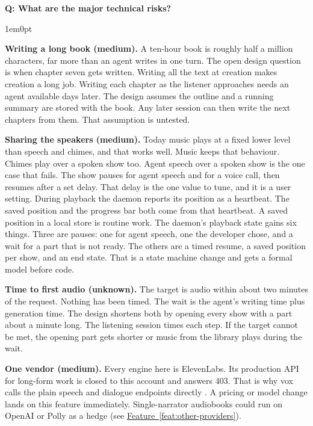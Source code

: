 \documentclass[11pt,letterpaper]{article} %
\newcounter{faqnum} %
\newenvironment{faqpair}[1]{%
  \needspace{4\baselineskip}%
  \vspace{0.5em}%
  \refstepcounter{faqnum}%
  \noindent\textbf{\color{SectionBlue}Q\thefaqnum: #1}\par\nopagebreak[4]%
  \vspace{0.2em}%
  \begin{adjustwidth}{1em}{0pt}%
  \setlength{\parindent}{0pt}%
  \setlength{\parskip}{0.5em}%
}{%
  \end{adjustwidth}%
  \vspace{0.5em}%
}
\newcommand{\featureref}[1]{\hyperref[#1]{Feature~\ref*{#1}}}
\begin{document}
\begin{faqpair}{What are the major technical risks?}
  \textbf{Writing a long book (medium).} A ten-hour book is roughly half a
  million characters, far more than an agent writes in one turn. The open
  design question is when chapter seven gets written. Writing all the text
  at creation makes creation a long job. Writing each chapter as the
  listener approaches needs an agent available days later. The design
  assumes the outline and a running summary are stored with the book. Any
  later session can then write the next chapters from them. That
  assumption is untested.

  \textbf{Sharing the speakers (medium).} Today music plays at a fixed lower
  level than speech and chimes, and that works well. Music keeps that
  behaviour. Chimes play over a spoken show too. Agent speech over a spoken
  show is the one case that fails. The show pauses for agent speech and for
  a voice call, then resumes after a set delay. That delay is the one value
  to tune, and it is a user setting. During playback the daemon reports
  its position as a heartbeat. The saved position and the progress bar both
  come from that heartbeat. A saved position in a local store is routine
  work. The daemon's playback state gains six things. Three are pauses: one
  for agent speech, one the developer chose, and a wait for a part that is
  not ready. The others are a timed resume, a saved position per show, and
  an end state. That is a state machine change and gets a formal model before
  code.

  \textbf{Time to first audio (unknown).} The target is audio within about
  two minutes of the request. Nothing has been timed. The wait is the
  agent's writing time plus generation time. The design shortens both by
  opening every show with a part about a minute long. The listening session
  times each step. If the target cannot be met, the opening part gets
  shorter or music from the library plays during the wait.

  \textbf{One vendor (medium).} Every engine here is ElevenLabs. Its
  production API for long-form work is closed to this account and answers
  403. That is why vox calls the plain speech and dialogue endpoints
  directly \cite{voxspike2026audiobook}. A pricing or model change lands on
  this feature immediately. Single-narrator audiobooks could run on OpenAI
  or Polly as a hedge (see \featureref{feat:other-providers}).
\end{faqpair}
\end{document}
